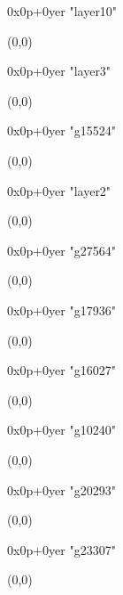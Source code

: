    0x0p+0yer "layer10"
  \begin{textblock}{1}(0,0)
  \end{textblock}

   0x0p+0yer "layer3"
  \begin{textblock}{1}(0,0)
  \end{textblock}

   0x0p+0yer "g15524"
  \begin{textblock}{1}(0,0)
  \end{textblock}

   0x0p+0yer "layer2"
  \begin{textblock}{1}(0,0)
  \end{textblock}

   0x0p+0yer "g27564"
  \begin{textblock}{1}(0,0)
  \end{textblock}

   0x0p+0yer "g17936"
  \begin{textblock}{1}(0,0)
  \end{textblock}

   0x0p+0yer "g16027"
  \begin{textblock}{1}(0,0)
  \end{textblock}

   0x0p+0yer "g10240"
  \begin{textblock}{1}(0,0)
  \end{textblock}

   0x0p+0yer "g20293"
  \begin{textblock}{1}(0,0)
  \end{textblock}

   0x0p+0yer "g23307"
  \begin{textblock}{1}(0,0)
  \end{textblock}


